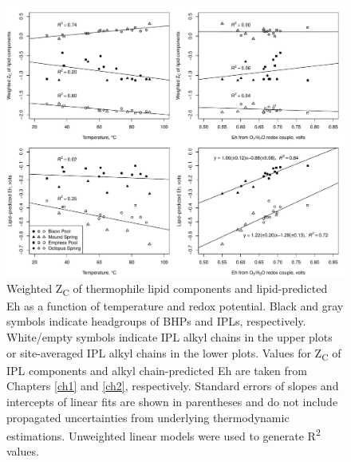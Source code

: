 \singlespace
\begin{figure}[h]
\centering
\includegraphics[width=1\linewidth]{figs_ch3/ZC_Eh_fourpanel.pdf}
\caption[Weighted Z\textsubscript{C} of thermophile lipid components and lipid-predicted Eh as a function of temperature and redox potential]{Weighted Z\textsubscript{C} of thermophile lipid components and lipid-predicted Eh as a function of temperature and redox potential. Black and gray symbols indicate headgroups of BHPs and IPLs, respectively. White/empty symbols indicate IPL alkyl chains in the upper plots or site-averaged IPL alkyl chains in the lower plots. Values for Z\textsubscript{C} of IPL components and alkyl chain-predicted Eh are taken from Chapters \ref{ch1} and \ref{ch2}, respectively. Standard errors of slopes and intercepts of linear fits are shown in parentheses and do not include propagated uncertainties from underlying thermodynamic estimations. Unweighted linear models were used to generate R\textsuperscript{2} values.}
\label{fig:ZC_Eh_fourpanel}
\end{figure}
\doublespace